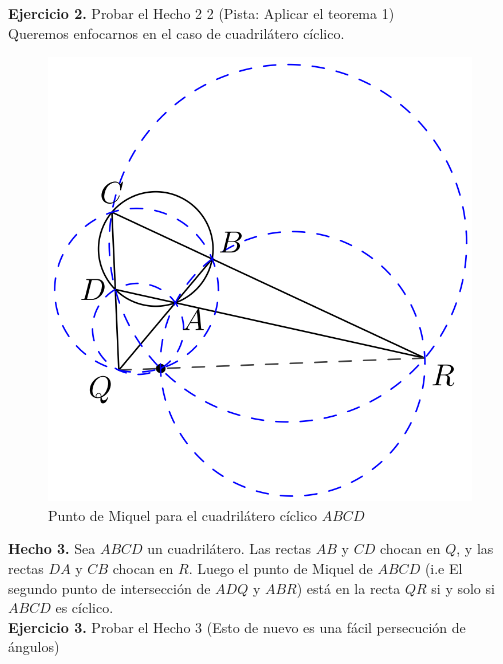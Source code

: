 \documentclass[11pt, a4paper]{article}
\begin{document}
\textbf{Ejercicio 2.} Probar el Hecho 2 2 (Pista: Aplicar el teorema 1) \\

Queremos enfocarnos en el caso de cuadril\'atero c\'iclico.
\begin{figure}[h]
	\centering
	\includegraphics[scale=0.25]{p3.2}
	\caption{Punto de Miquel para el cuadril\'atero c\'iclico $ABCD$}
\end{figure}
\textbf{Hecho 3.} Sea $ABCD$ un cuadril\'atero. Las rectas $AB$ y $CD$ chocan en $Q$, y las rectas $DA$ y $CB$ chocan en $R$. Luego el punto de Miquel de $ABCD$ (i.e El segundo punto de intersecci\'on de $ADQ$ y $ABR$) est\'a en la recta $QR$ si y solo si $ABCD$ es c\'iclico.\\

\textbf{Ejercicio 3.} Probar el Hecho 3 (Esto de nuevo es una f\'acil persecuci\'on de \'angulos)
\end{document}

